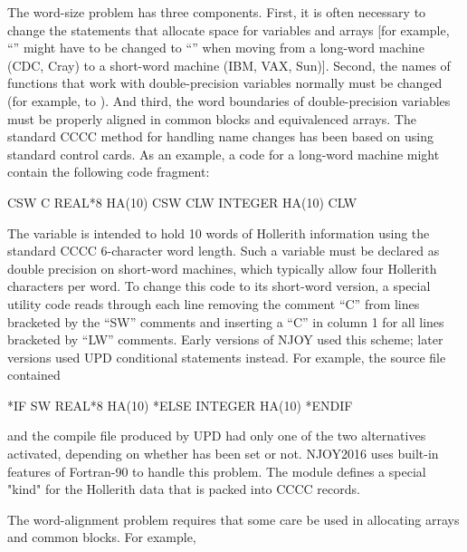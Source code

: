 The word-size problem has three components.  First, it is often
necessary to change the statements that allocate space for variables
and arrays [for example, ``'' might have to be
changed to ``'' when moving from a long-word
machine (CDC, Cray) to a short-word machine (IBM, VAX, Sun)].  Second,
the names of functions that work with double-precision variables
normally must be changed (for example,  to ).
And third, the word boundaries of double-precision variables must be
properly aligned in common blocks and equivalenced arrays.  The standard
CCCC method for handling name changes has been based on using standard
control cards.  As an example, a code for a long-word machine might
contain the following code fragment:

\newpage
\small
\begin{ccode}

CSW
C     REAL*8 HA(10)
CSW
CLW
      INTEGER HA(10)
CLW

\end{ccode}
\normalsize

The variable  is intended to hold 10 words of Hollerith
information using the standard CCCC 6-character word length.  Such a
variable must be declared as double precision on short-word machines,
which typically allow four Hollerith characters per word.  To change
this code to its short-word version, a special utility code reads
through each line removing the comment ``C'' from lines bracketed by
the ``SW'' comments and inserting a ``C'' in column 1 for all lines
bracketed by ``LW'' comments.  Early versions of NJOY used this
scheme; later versions used UPD\cite{UPD} conditional
statements instead.  For example, the source file contained

\small
\begin{ccode}

*IF SW
      REAL*8 HA(10)
*ELSE
      INTEGER HA(10)
*ENDIF

\end{ccode}
\normalsize

\noindent
and the compile file produced by UPD had only one of the two
alternatives activated, depending on whether  has been
set or not.  NJOY2016 uses built-in features of Fortran-90 to
handle this problem.  The  module defines a
special "kind" for the Hollerith data that is packed into
CCCC records.

The word-alignment problem requires that some care be used in
allocating arrays and common blocks.  For example,

